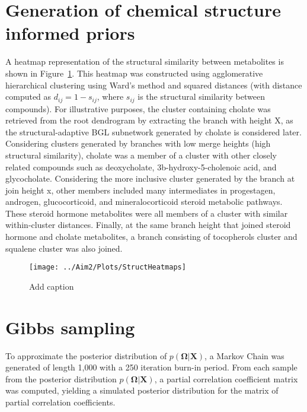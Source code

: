 \section{Generation of chemical structure informed priors}
A heatmap representation of the structural similarity between metabolites is shown in Figure~\ref{fig:heatmap}. This heatmap was constructed using agglomerative hierarchical clustering using Ward’s method and squared distances (with distance computed as $d_{ij}=1-s_{ij}$, where $s_{ij}$ is the structural similarity between compounds). For illustrative purposes, the cluster containing cholate was retrieved from the root dendrogram by extracting the branch with height X, as the structural-adaptive BGL subnetwork generated by cholate is considered later. Considering clusters generated by branches with low merge heights (high structural similarity), cholate was a member of a cluster with other closely related compounds such as deoxycholate, 3b-hydroxy-5-cholenoic acid, and glycocholate. Considering the more inclusive cluster generated by the branch at join height x, other members included many intermediates in progestagen, androgen, glucocorticoid, and mineralocorticoid steroid metabolic pathways. These steroid hormone metabolites were all members of a cluster with similar within-cluster distances. Finally, at the same branch height that joined steroid hormone and cholate metabolites, a branch consisting of tocopherols cluster and squalene cluster was also joined.

\newpage
{}
\recalctypearea
\begin{figure}[ht]
	\texttt{[image: ../Aim2/Plots/StructHeatmaps]}
	\caption[Add caption]{Add caption \label{fig:heatmap} }
\end{figure}
\newpage
{}
\recalctypearea

\section{Gibbs sampling}
To approximate the posterior distribution of $p(\boldsymbol{\Omega}|\textbf{X})$, a Markov Chain was generated of length 1,000 with a 250 iteration burn-in period. From each sample from the posterior distribution $p(\boldsymbol{\Omega}|\textbf{X})$, a partial correlation coefficient matrix was computed, yielding a simulated posterior distribution for the matrix of partial correlation coefficients.

